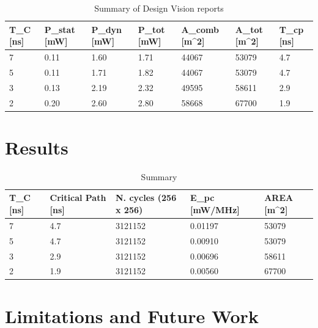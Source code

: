 \documentclass[11pt,a4paper]{article}
\begin{document}
\begin{table}[h]
	\caption{Summary of Design Vision reports}
	\begin{center}
		\begin{tabular}{|l|l|l|l|l|l|l|} \hline
			\textbf{T}_{C} [ns]	& \textbf{P}_{stat}	[mW] & \textbf{P}_{dyn} [mW]	& \textbf{P}_{tot} [mW] & \textbf{A}_{comb} [\mu m^2]& \textbf{A}_{tot} [\mu m^2] & \textbf{T}_{cp} [ns] \\ \hline
			7 & 0.11 & 1.60 & 1.71 & 44067 & 53079 & 4.7 \\ \hline
			5 & 0.11 & 1.71 & 1.82 & 44067 & 53079 & 4.7 \\ \hline
			3 & 0.13 & 2.19 & 2.32 & 49595 & 58611 & 2.9 \\ \hline
			2 & 0.20 & 2.60 & 2.80 & 58668 & 67700 & 1.9 \\ \hline
			
		\end{tabular}
	\end{center}
	\label{tab:synth}
\end{table}

\FloatBarrier
\section{Results}
\label{sec:results}


\begin{table}[h]
	\caption{Summary}
	\begin{center}
		\begin{tabular}{|p{1cm}|p{2cm}|p{2cm}|l|l|} \hline
			\textbf{T}_C [ns] & \textbf{Critical Path} [ns] & \textbf{N. cycles} (256 x 256) & \textbf{E}_{pc} [mW/MHz] & \textbf{AREA} [\mu m^2] \\ \hline
			7 & 4.7 & 3121152 & 0.01197 & 53079 \\ \hline
			5 & 4.7 & 3121152 & 0.00910 & 53079 \\ \hline
			3 & 2.9 & 3121152 & 0.00696 & 58611 \\ \hline
			2 & 1.9 & 3121152 & 0.00560 & 67700 \\ \hline
		
		\end{tabular}
	\end{center}
	\label{tab:conclusion}
\end{table}


\section{Limitations and Future Work}
\end{document}
